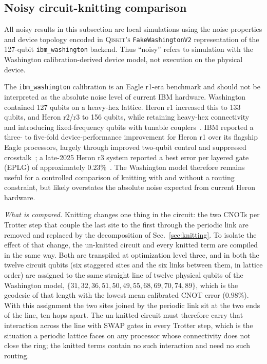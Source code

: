 \documentclass[twocolumn,superscriptaddress,showpacs,nofootinbib,notitlepage,preprintnumbers,secnumarabic,amssymb, floatfix, nobibnotes, aps, prd]{revtex4-2}
\newcommand{\washington}{\texttt{ibm\_washington}}
\begin{document}
\subsection{Noisy circuit-knitting comparison}
\label{sec:noisy-knitting}

All noisy results in this subsection are local simulations using the noise
properties and device topology encoded in
\textsc{Qiskit's} \texttt{FakeWashingtonV2} representation of the 127-qubit
\washington{} backend.  Thus ``noisy'' refers to simulation with the
Washington calibration-derived device model, not execution on the physical
device.

The \washington{} calibration is an Eagle r1-era benchmark and should not be
interpreted as the absolute noise level of current IBM hardware.  Washington
contained 127 qubits on a heavy-hex lattice.  Heron r1 increased this to 133
qubits, and Heron r2/r3 to 156 qubits, while retaining heavy-hex connectivity
and introducing fixed-frequency qubits with tunable
couplers~\cite{ibm-processor-types}.  IBM reported a
three- to five-fold device-performance improvement for Heron r1 over its
flagship Eagle processors, largely through improved two-qubit control and
suppressed crosstalk~\cite{ibm-heron-system-two}; a late-2025 Heron r3 system
reported a best error per layered gate (EPLG) of approximately
$0.23\%$~\cite{ibm-q4-2025}.  The Washington model therefore remains useful
for a controlled comparison of knitting with and without a routing
constraint, but likely overstates the absolute noise expected from current
Heron hardware.

\noindent\textit{What is compared.}\quad
Knitting changes one thing in the circuit: the two CNOTs per Trotter step
that couple the last site to the first through the periodic link are removed
and replaced by the decomposition of Sec.~\ref{sec:knitting}.  To isolate the
effect of that change, the un-knitted circuit and every knitted term are
compiled in the same way.  Both are transpiled at optimization level three,
and in both the twelve circuit qubits (six staggered sites and the six links
between them, in lattice order) are assigned to the same straight line of
twelve physical qubits of the Washington model,
$\{31,32,36,51,50,49,55,68,69,70,74,89\}$, which is the geodesic of that
length with the lowest mean calibrated CNOT error ($0.98\%$).  With this
assignment the two sites joined by the periodic link sit at the two ends of
the line, ten hops apart.  The un-knitted circuit must therefore carry that
interaction across the line with SWAP gates in every Trotter step, which is
the situation a periodic lattice faces on any processor whose connectivity
does not close the ring; the knitted terms contain no such interaction and
need no such routing.
\end{document}
